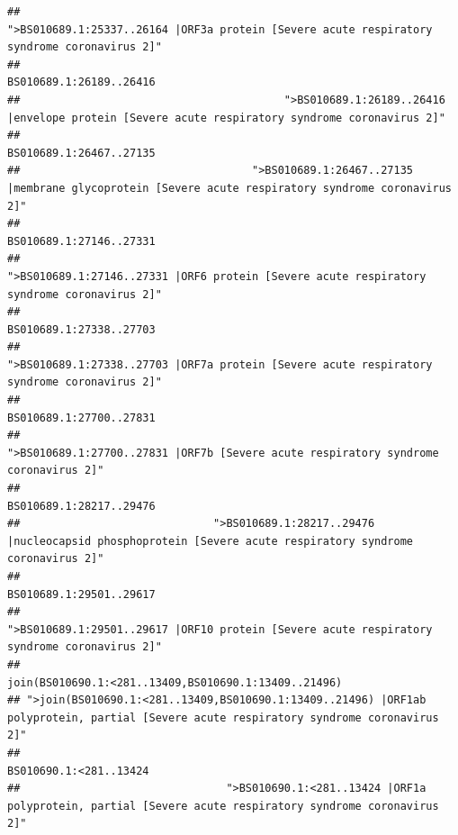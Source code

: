 \documentclass[
]{article}
\begin{document}
\begin{verbatim}
##                                            ">BS010689.1:25337..26164 |ORF3a protein [Severe acute respiratory syndrome coronavirus 2]" 
##                                                                                                                BS010689.1:26189..26416 
##                                         ">BS010689.1:26189..26416 |envelope protein [Severe acute respiratory syndrome coronavirus 2]" 
##                                                                                                                BS010689.1:26467..27135 
##                                    ">BS010689.1:26467..27135 |membrane glycoprotein [Severe acute respiratory syndrome coronavirus 2]" 
##                                                                                                                BS010689.1:27146..27331 
##                                             ">BS010689.1:27146..27331 |ORF6 protein [Severe acute respiratory syndrome coronavirus 2]" 
##                                                                                                                BS010689.1:27338..27703 
##                                            ">BS010689.1:27338..27703 |ORF7a protein [Severe acute respiratory syndrome coronavirus 2]" 
##                                                                                                                BS010689.1:27700..27831 
##                                                    ">BS010689.1:27700..27831 |ORF7b [Severe acute respiratory syndrome coronavirus 2]" 
##                                                                                                                BS010689.1:28217..29476 
##                              ">BS010689.1:28217..29476 |nucleocapsid phosphoprotein [Severe acute respiratory syndrome coronavirus 2]" 
##                                                                                                                BS010689.1:29501..29617 
##                                            ">BS010689.1:29501..29617 |ORF10 protein [Severe acute respiratory syndrome coronavirus 2]" 
##                                                                                   join(BS010690.1:<281..13409,BS010690.1:13409..21496) 
## ">join(BS010690.1:<281..13409,BS010690.1:13409..21496) |ORF1ab polyprotein, partial [Severe acute respiratory syndrome coronavirus 2]" 
##                                                                                                                 BS010690.1:<281..13424 
##                                ">BS010690.1:<281..13424 |ORF1a polyprotein, partial [Severe acute respiratory syndrome coronavirus 2]" 

\end{verbatim}
\end{document}
